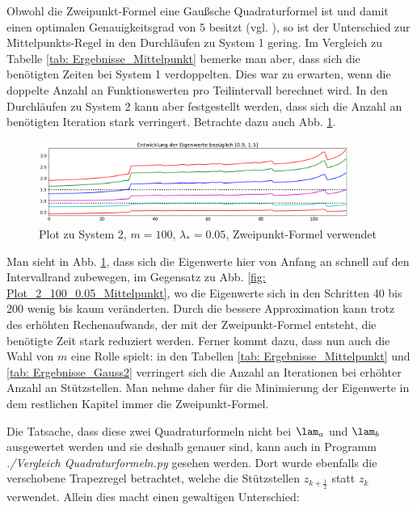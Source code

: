 \documentclass[a4paper,12pt]{report}
\newcommand{\zitat}[1]{\glqq #1\grqq}
\newcommand{\1}{\mathds{1}}
\theoremstyle{plain} %
\theoremstyle{definition} %
\theoremstyle{remark}
\begin{document}
            Obwohl die Zweipunkt-Formel eine \zitat{Gaußsche Quadraturformel}\cite[S. 523]{numerikHermann} ist
            und damit einen optimalen Genauigkeitsgrad von 5 besitzt (vgl. \cite[S. 522f.]{numerikHermann}),
            so ist der Unterschied zur Mittelpunkts-Regel in den Durchläufen zu System 1 gering.
            Im Vergleich zu Tabelle \ref{tab: Ergebnisse_Mittelpunkt} bemerke man aber, dass sich die benötigten Zeiten bei System 1 verdoppelten.
            Dies war zu erwarten, wenn die doppelte Anzahl an Funktionswerten pro Teilintervall berechnet wird.
            In den Durchläufen zu System 2 kann aber festgestellt werden, dass sich die Anzahl an benötigten Iteration stark verringert.
            Betrachte dazu auch Abb. \ref{fig: Plot_2_100_0.05_Gauss2}.
            \begin{figure}[h!t]
                  \centering
                  \includegraphics[width=0.9\textwidth, keepaspectratio]{./Gauss2/Plot_2_100_0.05.png}
                  \caption[System 2, $m=100$, $\lambda_*=0.05$, Zweipunkt-Formel]{Plot zu System 2, $m=100$, $\lambda_*=0.05$, Zweipunkt-Formel verwendet}
                  \label{fig: Plot_2_100_0.05_Gauss2}
            \end{figure}

            Man sieht in Abb. \ref{fig: Plot_2_100_0.05_Gauss2}, dass sich die Eigenwerte hier von Anfang an schnell auf den Intervallrand zubewegen,
            im Gegensatz zu Abb. \ref{fig: Plot_2_100_0.05_Mittelpunkt}, wo die Eigenwerte sich in den Schritten 40 bis 200 wenig bis kaum veränderten.
            Durch die bessere Approximation kann trotz des erhöhten Rechenaufwands, der mit der Zweipunkt-Formel entsteht, die benötigte Zeit stark reduziert werden.
            Ferner kommt dazu, dass nun auch die Wahl von $m$ eine Rolle spielt: in den Tabellen \ref{tab: Ergebnisse_Mittelpunkt} 
            und \ref{tab: Ergebnisse_Gauss2} verringert sich die Anzahl an Iterationen bei erhöhter Anzahl an Stützstellen.
            Man nehme daher für die Minimierung der Eigenwerte in dem restlichen Kapitel immer die Zweipunkt-Formel.

            Die Tatsache, dass diese zwei Quadraturformeln nicht bei $\lam_a$ und $\lam_b$ ausgewertet werden und sie deshalb genauer sind,
            kann auch in Programm \textit{./Vergleich Quadraturformeln.py} gesehen werden.
            Dort wurde ebenfalls die verschobene Trapezregel betrachtet, welche die Stützstellen $z_{k+\frac 1 2}$ statt $z_k$ verwendet.
            Allein dies macht einen gewaltigen Unterschied:
\end{document}
